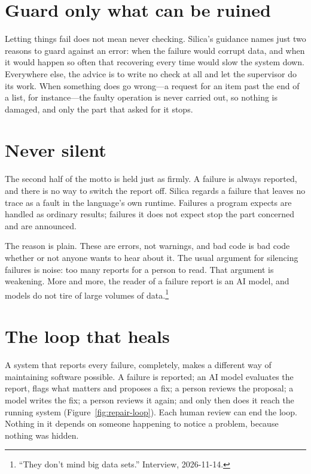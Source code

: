 \section{Guard only what can be ruined}

Letting things fail does not mean never checking. Silica's guidance names just
two reasons to guard against an error: when the failure would corrupt data, and
when it would happen so often that recovering every time would slow the system
down. Everywhere else, the advice is to write no check at all and let the
supervisor do its work. When something does go wrong---a request for an item
past the end of a list, for instance---the faulty operation is never carried
out, so nothing is damaged, and only the part that asked for it stops.


\section{Never silent}

The second half of the motto is held just as firmly. A failure is always
reported, and there is no way to switch the report off. Silica regards a
failure that leaves no trace as a fault in the language's own runtime. Failures
a program expects are handled as ordinary results; failures it does not expect
stop the part concerned and are announced.

The reason is plain. These are errors, not warnings, and bad code is bad code
whether or not anyone wants to hear about it. The usual argument for silencing
failures is noise: too many reports for a person to read. That argument is
weakening. More and more, the reader of a failure report is an AI model, and
models do not tire of large volumes of data.\footnote{``They don't mind big data
sets.'' Interview, 2026-11-14.}

\section{The loop that heals}

A system that reports every failure, completely, makes a different way of
maintaining software possible. A failure is reported; an AI model evaluates the
report, flags what matters and proposes a fix; a person reviews the proposal; a
model writes the fix; a person reviews it again; and only then does it reach the
running system (Figure~\ref{fig:repair-loop}). Each human review can end the
loop. Nothing in it depends on someone happening to notice a problem, because
nothing was hidden.

